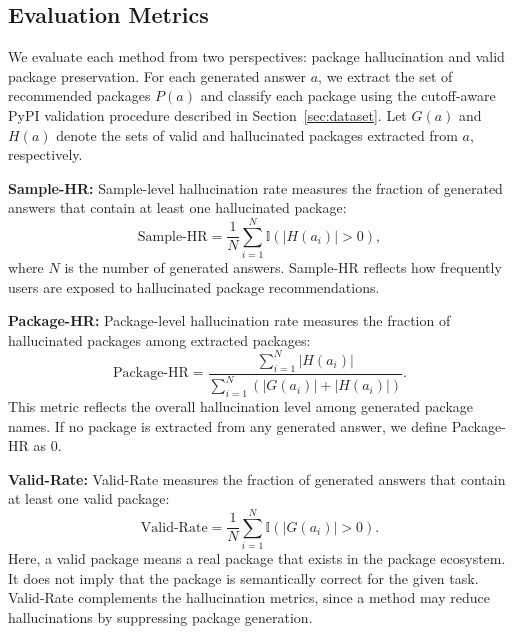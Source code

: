 \subsection{Evaluation Metrics}
We evaluate each method from two perspectives: package hallucination and valid package preservation. For each generated answer $a$, we extract the set of recommended packages $P(a)$ and classify each package using the cutoff-aware PyPI validation procedure described in Section~\ref{sec:dataset}. Let $G(a)$ and $H(a)$ denote the sets of valid and hallucinated packages extracted from $a$, respectively.

\noindent\textbf{Sample-HR:} Sample-level hallucination rate measures the fraction of generated answers that contain at least one hallucinated package:
\begin{equation}
\label{eqa:sample-HR}
\mathrm{Sample\mbox{-}HR}
=
\frac{1}{N}
\sum_{i=1}^{N}
\mathbb{I}\left(|H(a_i)| > 0\right),
\end{equation}
where $N$ is the number of generated answers. Sample-HR reflects how frequently users are exposed to hallucinated package recommendations.

\noindent\textbf{Package-HR:} Package-level hallucination rate measures the fraction of hallucinated packages among extracted packages:
\begin{equation}
\mathrm{Package\mbox{-}HR}
=
\frac{
\sum_{i=1}^{N} |H(a_i)|
}{
\sum_{i=1}^{N} \left(|G(a_i)| + |H(a_i)|\right)
}.
\end{equation}
This metric reflects the overall hallucination level among generated package names. If no package is extracted from any generated answer, we define Package-HR as 0.

\noindent\textbf{Valid-Rate:} Valid-Rate measures the fraction of generated answers that contain at least one valid package:
\begin{equation}
\mathrm{Valid\mbox{-}Rate}
=
\frac{1}{N}
\sum_{i=1}^{N}
\mathbb{I}\left(|G(a_i)| > 0\right).
\end{equation}
Here, a valid package means a real package that exists in the package ecosystem. It does not imply that the package is semantically correct for the given task. 
Valid-Rate complements the hallucination metrics, since a method may reduce hallucinations by suppressing package generation.






